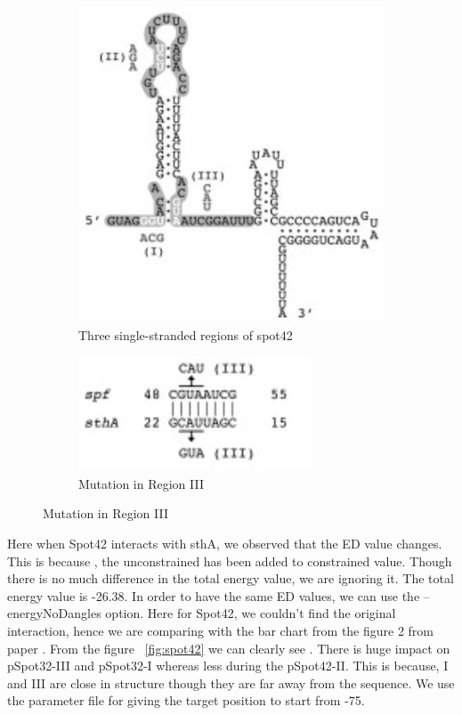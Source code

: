 \documentclass[twoside,a4paper]{report}
\begin{document}
 \begin{figure}[h!tb]
	\centering
	\begin{subfigure}{.5\textwidth}
		\centering
		\includegraphics[width=.9\linewidth]{bei}
		\caption{Three single-stranded regions of spot42}
		\label{fig:bei}
	\end{subfigure}%
	\begin{subfigure}{.5\textwidth}
		\centering
		\includegraphics[width=.9\linewidth]{bei1}
		\caption{Mutation in Region III }
		\label{fig:bei1}
	\end{subfigure}
\end{figure}
	 
	 
	  Here when Spot42 interacts with sthA, we observed that the ED value changes. This is because , the unconstrained has been added to constrained value. Though there is no much difference in the total energy value, we are ignoring it. The total energy value is -26.38. In order to have the same ED values, we can use the --energyNoDangles option. Here for Spot42, we couldn't find the original interaction, hence we are comparing with the bar chart from the figure 2 from paper {\citep{beisel2011base}} . From the figure ~\ref{fig:spot42} we can clearly see . There is huge impact on pSpot32-III and pSpot32-I whereas less during the pSpot42-II. This is because, I and III are close in structure though they are far away from the sequence. We use the parameter file for giving the target position to start from -75.\\
	  
\end{document}
